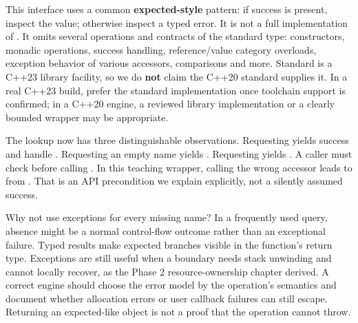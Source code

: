 This interface uses a common \textbf{expected-style} pattern: if success is present, inspect the value; otherwise inspect a typed error. It is not a full implementation of . It omits several operations and contracts of the standard type: constructors, monadic operations,  success handling, reference/value category overloads, exception behavior of various accessors, comparisons and more. Standard  is a C++23 library facility, so we do \textbf{not} claim the C++20 standard supplies it. In a real C++23 build, prefer the standard implementation once toolchain support is confirmed; in a C++20 engine, a reviewed library implementation or a clearly bounded wrapper may be appropriate.

The lookup now has three distinguishable observations. Requesting  yields success and handle . Requesting an empty name yields . Requesting  yields . A caller must check  before calling . In this teaching wrapper, calling the wrong accessor leads to  from . That is an API precondition we explain explicitly, not a silently assumed success.

Why not use exceptions for every missing name? In a frequently used query, absence might be a normal control-flow outcome rather than an exceptional failure. Typed results make expected branches visible in the function's return type. Exceptions are still useful when a boundary needs stack unwinding and cannot locally recover, as the Phase 2 resource-ownership chapter derived. A correct engine should choose the error model by the operation's semantics and document whether allocation errors or user callback failures can still escape. Returning an expected-like object is not a proof that the operation cannot throw.

